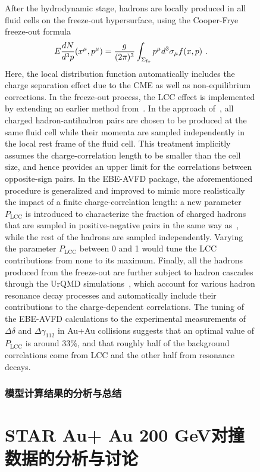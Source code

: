 \begin{figure}[htbp]
After the hydrodynamic stage, hadrons are locally produced in all fluid cells on the freeze-out hypersurface, using the Cooper-Frye freeze-out formula 
\begin{eqnarray}\label{eq_cooperfrye}
E \frac{dN}{d^3p} (x^\mu, p^\mu) = \frac{g}{(2\pi)^3} \int_{\Sigma_{\rm fo}} p^\mu d^3\sigma_\mu f(x,p) \,\, .
\end{eqnarray} 
Here, the local distribution function automatically  includes the charge separation effect due to the CME as well as  non-equilibrium corrections. 
In the freeze-out process, the LCC effect is implemented by extending an earlier method from~\cite{Schenke:2019ruo}. In the approach of~\cite{Schenke:2019ruo},  all charged hadron-antihadron pairs are chosen to be produced at the same fluid cell while their momenta are sampled independently in the local rest frame of the fluid cell. This treatment implicitly assumes the charge-correlation length to be smaller than the cell size, and hence provides an upper limit for the correlations between opposite-sign pairs. In the EBE-AVFD package, the aforementioned procedure is generalized and improved to mimic more realistically the impact of a finite charge-correlation length:   a new parameter $P_\text{LCC}$ is introduced to characterize the fraction of charged hadrons that are sampled in positive-negative pairs in the same way as~\cite{Schenke:2019ruo}, while the rest of the hadrons are sampled independently. Varying the parameter $P_\text{LCC}$ between 0 and 1 would tune the LCC contributions from none to its maximum. 
Finally, all the hadrons produced from the freeze-out are further subject to hadron cascades through the UrQMD simulations~\cite{Bleicher:1999xi}, which  account for various hadron resonance decay processes and automatically include their contributions to the charge-dependent correlations. The tuning of the EBE-AVFD calculations to the experimental measurements of $\Delta\delta$  and $\Delta\gamma_{112}$ in Au+Au collisions suggests that an optimal value of   $P_\text{LCC}$ is around   $33\%$, and that roughly half of the background correlations come  from LCC and the other half from resonance decays. 


\subsubsection{模型计算结果的分析与总结}





\section{STAR Au+ Au 200 GeV对撞数据的分析与讨论}


\end{figure}
